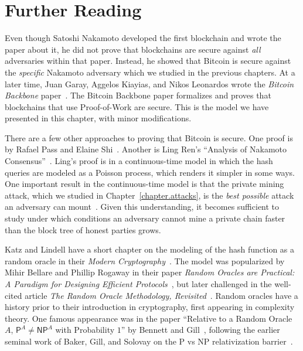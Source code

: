 \section{Further Reading}
Even though Satoshi Nakamoto developed the first blockchain and wrote the paper about it, he did
not prove that blockchains are secure against \emph{all} adversaries within that paper. Instead,
he showed that Bitcoin is secure against the \emph{specific} Nakamoto adversary which we studied
in the previous chapters. At a later time, Juan Garay, Aggelos Kiayias, and Nikos Leonardos
wrote the \emph{Bitcoin Backbone} paper~\cite{backbone}.
The Bitcoin Backbone paper formalizes and proves that blockchains that use Proof-of-Work
are secure. This is the model we have presented in this chapter, with minor modifications.

There are a few other approaches to proving that Bitcoin is secure. One proof is by
Rafael Pass and Elaine Shi~\cite{rethinking-consensus}. Another is Ling Ren's
``Analysis of Nakamoto Consensus''~\cite{ling-analysis}. Ling's proof is in a continuous-time
model in which the hash queries are modeled as a Poisson process, which renders it simpler
in some ways. One important result in the continuous-time model is that the private mining
attack, which we studied in Chapter~\ref{chapter.attacks}, is the \emph{best possible} attack
an adversary can mount~\cite{nakamoto-wins}. Given this understanding, it becomes sufficient
to study under which conditions an adversary cannot mine a private chain faster than the block tree of
honest parties grows.

Katz and Lindell have a short chapter on the modeling of the hash function as a random oracle
in their \emph{Modern Cryptography}~\cite{katz}. The model was popularized by Mihir Bellare
and Phillip Rogaway in their paper \emph{Random Oracles are Practical: A Paradigm for Designing
Efficient Protocols}~\cite{ro}, but later challenged in the well-cited article \emph{The Random
Oracle Methodology, Revisited}~\cite{ro-revisited}. Random oracles have a history prior to their introduction in
cryptography, first appearing in complexity theory. One famous appearance was in
the paper ``Relative to a Random Oracle $A$, $\textsf{P}^A \neq \textsf{NP}^A$
with Probability $1$'' by Bennett and Gill~\cite{p-vs-np-randomoracle}, following the earlier seminal
work of Baker, Gill, and Solovay on the \textsf{P} vs \textsf{NP} relativization
barrier~\cite{relativization-barrier}.